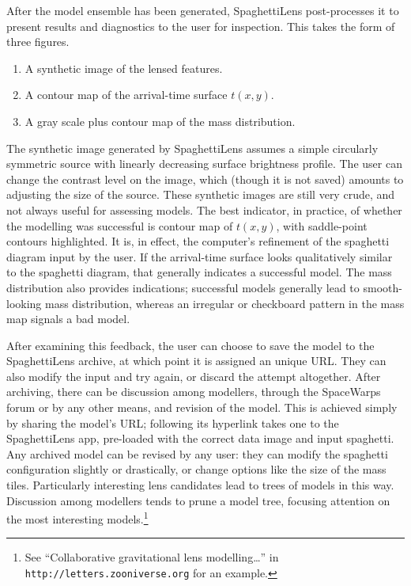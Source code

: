 \documentclass[usenatbib]{mn2e}
\newcommand{\spl}{SpaghettiLens\xspace}
\newcommand{\sw}{SpaceWarps\xspace}
\begin{document}
After the model ensemble has been generated, \spl post-processes it to
present results and diagnostics to the user for inspection. This takes
the form of three figures.
\begin{enumerate}
\item A synthetic image of the lensed features.
\item A contour map of the arrival-time surface $t(x,y)$.
\item A gray scale plus contour map of the mass distribution.
\end{enumerate}
The synthetic image generated by \spl assumes a simple
circularly symmetric source with linearly decreasing
surface brightness profile.  The user can change the contrast level
on the image, which (though it is not saved) amounts to adjusting the
size of the source. These synthetic images are still very
crude, and not always useful for assessing models.  The best
indicator, in practice, of whether the modelling was successful is
contour map of $t(x,y)$, with saddle-point contours highlighted.  It
is, in effect, the computer's refinement of the spaghetti diagram
input by the user.  If the arrival-time surface looks qualitatively
similar to the spaghetti diagram, that generally indicates a
successful model.  The mass distribution also provides indications;
successful models generally lead to smooth-looking mass distribution,
whereas an irregular or checkboard pattern in the mass map signals a
bad model.

After examining this feedback, the user can choose to save the
model to the \spl archive, at which point it is assigned an unique
URL.  They can also modify the input and try again, or discard the
attempt altogether.  After archiving, there can be discussion among
modellers, through the \sw forum or by any other means, and revision
of the model.  This is achieved simply by sharing the model's
URL; following its hyperlink takes one to the \spl app, pre-loaded
with the correct data image and input spaghetti. Any archived model
can be revised by any user: they can modify the spaghetti
configuration slightly or drastically, or change options like the size
of the mass tiles. Particularly interesting lens candidates lead to
trees of models in this way.  Discussion among modellers tends to
prune a model tree, focusing attention on the most interesting
models.\footnote{See ``Collaborative gravitational lens
modelling\dots'' in {\tt http://letters.zooniverse.org} for an example.}
\end{document}
